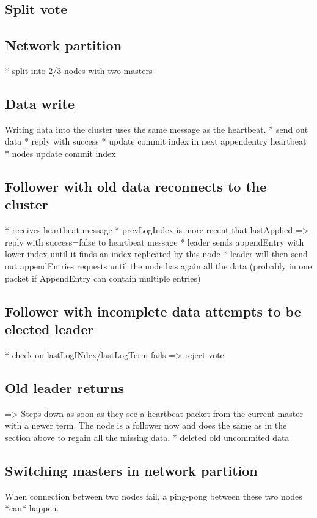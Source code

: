 \subsection{Split vote}

\subsection{Network partition}
* split into 2/3 nodes with two masters

\subsection{Data write}
Writing data into the cluster uses the same message as the heartbeat.
* send out data
* reply with success
* update commit index in next appendentry heartbeat
* nodes update commit index

\subsection{Follower with old data reconnects to the cluster}
* receives heartbeat message
* prevLogIndex is more recent that lastApplied => reply with success=false to heartbeat message
* leader sends appendEntry with lower index until it finds an index replicated by this node
* leader will then send out appendEntries requests until the node has again all the data (probably in one packet if AppendEntry can contain multiple entries)

\subsection{Follower with incomplete data attempts to be elected leader}
* check on lastLogINdex/lastLogTerm fails => reject vote

\subsection{Old leader returns}
=> Steps down as soon as they see a heartbeat packet from the current master with a newer term.
The node is a follower now and does the same as in the section above to regain all the missing data.
* deleted old uncommited data

\subsection{Switching masters in network partition}
When connection between two nodes fail, a ping-pong between these two nodes *can* happen.

